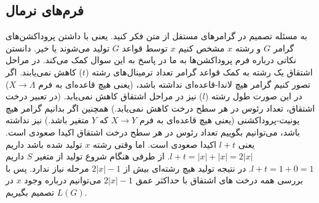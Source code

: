 \documentclass[main.tex]{subfiles}
\begin{document}
	\subsection{فرم‌های نرمال}
	به مسئله تصمیم در گرامر‌های مستقل از متن فکر کنید. یعنی با داشتن پروداکشن‌های گرامر $G$ و رشته $x$ مشخص کنیم $x$ توسط قواعد $G$ تولید می‌شوند یا خیر.  دانستن نکاتی درباره فرم پروداکشن‌ها به ما در پاسخ به این سوال کمک می‌کند. در مراحل اشتقاق
	یک رشته به کمک قواعد گرامر تعداد ترمینال‌های رشته ($t$) کاهش نمی‌یابند. اگر تصور کنیم گرامر هیچ لاندا-قاعده‌ای
	 نداشته باشد، (یعنی هیچ قاعده‌ای به فرم 
	 $X \rightarrow \Lambda$)
	 در این صورت طول رشته ($l$) نیز در مراحل اشتقاق کاهش نمی‌یابد. (در تعبیر درخت اشتقاق، تعداد رئوس در هر سطح درخت کاهش نمی‌یابد.) همچنین اگر بدانیم گرامر هیچ یونیت-پروداکشنی 
	 (یعنی هیچ قاعده‌ای به فرم
	 $X \rightarrow Y$
	 که $Y$ متغیر باشد.)
	 نیز نداشته باشد، می‌توانیم بگوییم تعداد رئوس در هر سطح درخت اشتقاق اکیدا صعودی است. یعنی $l+ t$ اکیدا صعودی است. اما وقتی رشته $x$ تولید شده باشد داریم 
	 $l + t = |x| + |x| = 2|x|$.
	 از طرفی هنگام شروع تولید از متغیر $S$ داریم
	 $l + t = 1 + 0 = 1$.
	 در نتیجه تولید هیچ رشته‌ای بیش از
	 $2|x| - 1$
	 مرحله نیاز ندارد. پس با بررسی همه درخت های اشتقاق با حداکثر عمق 
	 $2|x| - 1$
	 می‌توانیم درباره وجود $x$ در 
	 $L(G)$
	 تصمیم بگیریم.
	 
\end{document}
